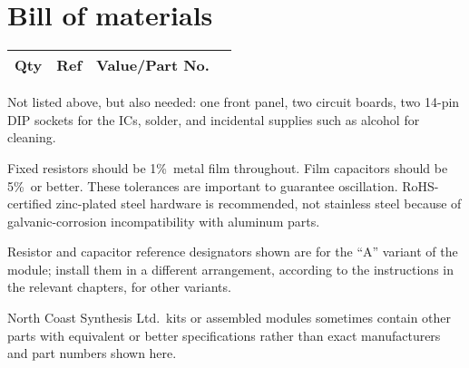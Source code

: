 
%
%
%
%
%
%

\onecolumn
\chapter{Bill of materials}

{\centering
{}

\begin{longtable}{rp{1in}cp{3in}}
  \textbf{Qty} & \textbf{Ref} & \textbf{Value/Part No.} & \\ \hline \endhead

\end{longtable}\par}

Not listed above, but also needed:  one front panel, two circuit boards, two
14-pin DIP sockets for the ICs, solder, and incidental supplies such as
alcohol for cleaning.

Fixed resistors should be 1\%\ metal film throughout.  Film capacitors
should be 5\%\ or better.  These tolerances are important to guarantee
oscillation.  RoHS-certified zinc-plated steel hardware is recommended, not
stainless steel because of galvanic-corrosion incompatibility with aluminum
parts.

Resistor and capacitor reference designators shown are for the ``A'' variant
of the module; install them in a different arrangement, according to the
instructions in the relevant chapters, for other variants.

North Coast Synthesis Ltd.\ kits or assembled modules sometimes contain
other parts with equivalent or better specifications rather than exact
manufacturers and part numbers shown here.  \twocolumn

